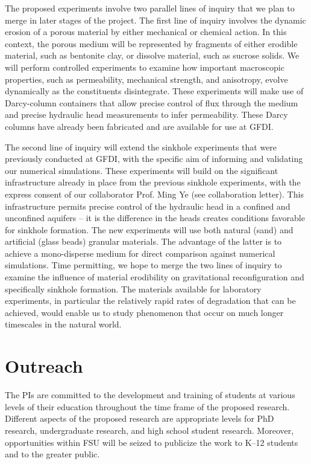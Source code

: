 \documentclass[11pt]{article}
\begin{document}
	The proposed experiments involve two parallel lines of inquiry that we plan to merge in later stages of the project. The first line of inquiry involves the dynamic erosion of a porous material by either mechanical or chemical action. In this context, the porous medium will be represented by fragments of either erodible material, such as bentonite clay, or dissolve material, such as sucrose solids. We will perform controlled experiments to examine how important macroscopic properties, such as permeability, mechanical strength, and anisotropy, evolve dynamically as the constituents disintegrate. These experiments will make use of Darcy-column containers that allow precise control of flux through the medium and precise hydraulic head measurements to infer permeability. These Darcy columns have already been fabricated and are available for use at GFDI. 
	
	The second line of inquiry will extend the sinkhole experiments that were previously conducted at GFDI, with the specific aim of informing and validating our numerical simulations. These experiments will build on the significant infrastructure already in place from the previous sinkhole experiments, with the express consent of our collaborator Prof. Ming Ye (see collaboration letter). This infrastructure permits precise control of the hydraulic head in a confined and unconfined aquifers -- it is the difference in the heads creates conditions favorable for sinkhole formation. The new experiments will use both natural (sand) and artificial (glass beads) granular materials. The advantage of the latter is to achieve a mono-disperse medium for direct comparison against numerical simulations. Time permitting, we hope to merge the two lines of inquiry to examine the influence of material erodibility on gravitational reconfiguration and specifically sinkhole formation. The materials available for laboratory experiments, in particular the relatively rapid rates of degradation that can be achieved, would enable us to study phenomenon that occur on much longer timescales in the natural world.



\section{Outreach}
The PIs are committed to the development and training of students at various levels of their education throughout the time frame of the proposed research. Different aspects of the proposed research are appropriate levels for PhD research, undergraduate research, and high school student research. Moreover, opportunities within FSU will be seized to publicize the work to K--12 students and to the greater public.
\end{document}
